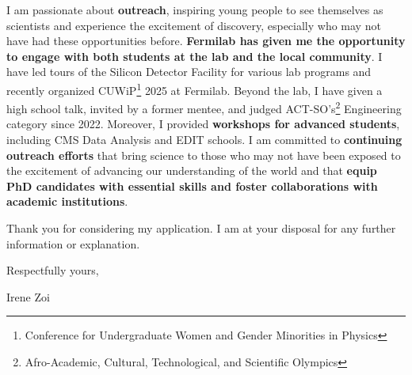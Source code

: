 {\begin{flushleft}


I am passionate about {\bf outreach}, inspiring young people to see themselves as scientists and experience the excitement of discovery, especially who may not have had these opportunities before. {\bf Fermilab has given me the opportunity to engage with both students at the lab and the local community}. I have led tours of the Silicon Detector Facility for various lab programs and recently organized CUWiP\footnote{Conference for Undergraduate Women and Gender Minorities in Physics} 2025 at Fermilab. Beyond the lab, I have given a high school talk, invited by a former mentee, and judged ACT-SO’s\footnote{Afro-Academic, Cultural, Technological, and Scientific Olympics} Engineering category since 2022. Moreover, I  provided {\bf workshops for advanced students}, including CMS Data Analysis and EDIT schools. I am committed to {\bf continuing outreach efforts} that bring science to those who may not have been exposed to the excitement of advancing our understanding of the world and that {\bf equip PhD candidates with essential skills and foster collaborations with academic institutions}.


Thank you for considering my application. I am at your disposal for any further information or explanation.

Respectfully yours,

Irene Zoi
\end{flushleft}

}